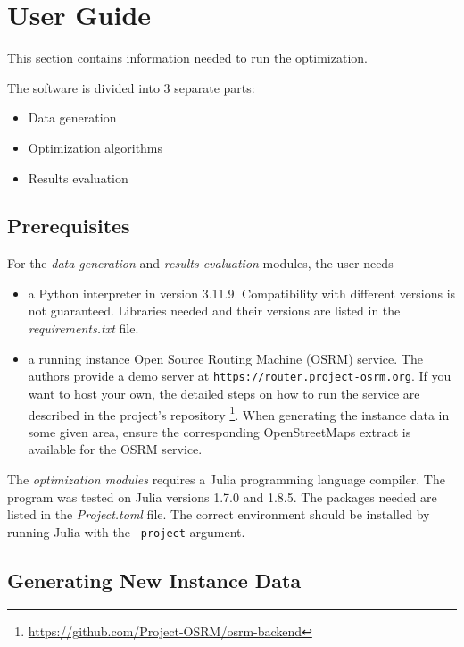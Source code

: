 \chapter{User Guide}

This section contains information needed to run the optimization.

The software is divided into 3 separate parts:

\begin{itemize}
    \setlength\itemsep{0pt}
    \item Data generation
    \item Optimization algorithms
    \item Results evaluation
\end{itemize}

\section{Prerequisites}

For the \textit{data generation} and \textit{results evaluation} modules, the user needs
\begin{itemize}
    \setlength\itemsep{0pt}
    \item a Python interpreter in version 3.11.9. Compatibility with different versions is not guaranteed. Libraries needed and their versions are listed in the \textit{requirements.txt} file. 
    \item a running instance Open Source Routing Machine (OSRM) \cite{luxen-vetter-2011} service. The authors provide a demo server at \texttt{https://router.project-osrm.org}. If you want to host your own, the detailed steps on how to run the service are described in the project's repository \footnote{\url{https://github.com/Project-OSRM/osrm-backend}}. When generating the instance data in some given area, ensure the corresponding OpenStreetMaps extract is available for the OSRM service.
\end{itemize}

The \textit{optimization modules} requires a Julia programming language compiler. The program was tested on Julia versions 1.7.0 and 1.8.5. The packages needed are listed in the \textit{Project.toml} file. The correct environment should be installed by running Julia with the \texttt{--project} argument.

\section{Generating New Instance Data}

